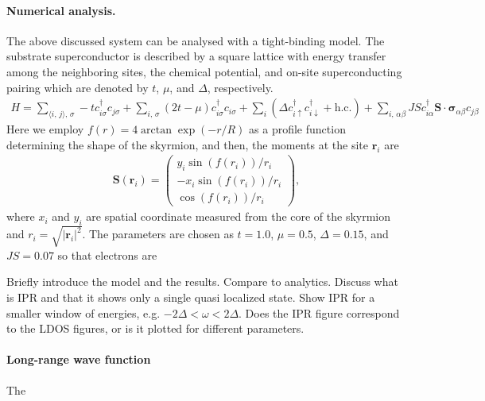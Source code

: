 \documentclass[twocolumn,showpacs,floatfix,nofootinbib,longbibliography]{revtex4-1}
\begin{document}
\paragraph*{Numerical analysis.} \label{sec:numerics}
The above discussed system can be analysed with a tight-binding model. The substrate superconductor is described by a square lattice with energy transfer among the neighboring sites, the chemical potential, and on-site superconducting pairing which are denoted by $t$, $\mu$, and $\Delta$, respectively.
\begin{align}
	H = \sum_{\langle i,\,j\rangle,\,\sigma} -t c_{i\sigma}^\dagger c_{j\sigma}
	+ \sum_{i,\,\sigma} (2t - \mu) c_{i\sigma}^\dagger c_{i\sigma}
	+ \sum_i (\Delta c_{i\uparrow}^\dagger c_{i\downarrow}^\dagger + \mathrm{h.c.})
	+ \sum_{i,\,\alpha\beta} JS c_{i\alpha}^\dagger \bm{S}\cdot\bm{\sigma}_{\alpha\beta} c_{j\beta}
	\label{eq:tbh}
\end{align}
Here we employ $f(r)=4\arctan\exp(-r/R)$ as a profile function determining the shape of the skyrmion, and then, the moments at the site $\bm{r}_i$ are
\begin{align}
	\bm{S}(\bm{r}_i) =
	\begin{pmatrix}
		y_i \sin(f(r_i))/r_i \\
		-x_i \sin(f(r_i))/r_i \\
		\cos(f(r_i))/r_i
	\end{pmatrix},
\end{align}
where $x_i$ and $y_i$ are spatial coordinate measured from the core of the skyrmion and $r_i=\sqrt{|\bm{r}_i|^2}$.
The parameters are chosen as $t=1.0$, $\mu=0.5$, $\Delta=0.15$, and $JS=0.07$ so that electrons are


Briefly introduce the model and the results. Compare to analytics. Discuss what is IPR and that it shows only a single quasi localized state. Show IPR for a smaller window of energies, e.g. $-2\Delta<\omega<2\Delta$. Does the IPR figure correspond to the LDOS figures, or is it plotted for different parameters.

\paragraph*{Long-range wave function} \label{sec:wavefuncion}
The
\end{document}
